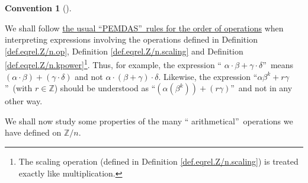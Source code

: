 \documentclass[numbers=enddot,12pt,final,onecolumn,notitlepage]{scrartcl}%
\numberwithin{exer}{subsection}
\theoremstyle{definition}
\newtheorem{conv}[theo]{Convention}
\newenvironment{convention}[1][]
{\begin{conv}[#1]\begin{leftbar}}
{\end{leftbar}\end{conv}}
\begin{document}
\begin{convention}
We shall follow \href{https://en.wikipedia.org/wiki/Order_of_operations}{the
usual \textquotedblleft PEMDAS\textquotedblright\ rules for the order of
operations} when interpreting expressions involving the operations defined in
Definition \ref{def.eqrel.Z/n.op}, Definition \ref{def.eqrel.Z/n.scaling} and
Definition \ref{def.eqrel.Z/n.kpower}\footnote{The scaling operation (defined
in Definition \ref{def.eqrel.Z/n.scaling}) is treated exactly like
multiplication.}. Thus, for example, the expression \textquotedblleft%
$\alpha\cdot\beta+\gamma\cdot\delta$\textquotedblright\ means $\left(
\alpha\cdot\beta\right)  +\left(  \gamma\cdot\delta\right)  $ and not
$\alpha\cdot\left(  \beta+\gamma\right)  \cdot\delta$. Likewise, the
expression \textquotedblleft$\alpha\beta^{k}+r\gamma$\textquotedblright\ (with
$r\in\mathbb{Z}$) should be understood as \textquotedblleft$\left(
\alpha\left(  \beta^{k}\right)  \right)  +\left(  r\gamma\right)
$\textquotedblright\ and not in any other way.
\end{convention}

We shall now study some properties of the many \textquotedblleft
arithmetical\textquotedblright\ operations we have defined on $\mathbb{Z}/n$.
\end{document}
